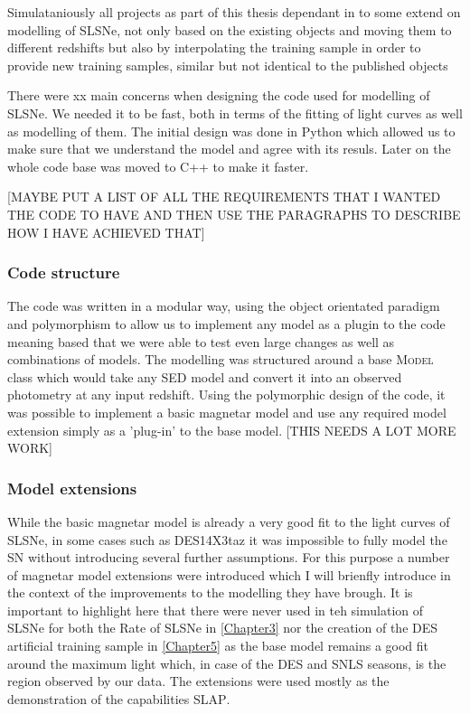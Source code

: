 Simulataniously all projects as part of this thesis dependant in to some extend on modelling of SLSNe, not only based on the existing objects and moving them to different redshifts but also by interpolating the training sample in order to provide new training samples, similar but not identical to the published objects

There were xx main concerns when designing the code used for modelling of SLSNe. We needed it to be fast, both in terms of the fitting of light curves as well as modelling of them. The initial design was done in Python which allowed us to make sure that we understand the model and agree with its resuls. Later on the whole code base was moved to C++ to make it faster.

[MAYBE PUT A LIST OF ALL THE REQUIREMENTS THAT I WANTED THE CODE TO HAVE AND THEN USE THE PARAGRAPHS TO DESCRIBE HOW I HAVE ACHIEVED THAT]

\subsubsection{Code structure}
The code was written in a modular way, using the object orientated paradigm and polymorphism to allow us to implement any model as a plugin to the code meaning based that we were able to test even large changes as well as combinations of models. The modelling was structured around a base \textsc{Model} class which would take any SED model and convert it into an observed photometry at any input redshift. Using the polymorphic design of the code, it was possible to implement a basic magnetar model and use any required model extension simply as a 'plug-in' to the base model. [THIS NEEDS A LOT MORE WORK]

\subsubsection{Model extensions}
While the basic magnetar model is already a very good fit to the light curves of SLSNe, in some cases such as DES14X3taz it was impossible to fully model the SN without introducing several further assumptions. For this purpose a number of magnetar model extensions were introduced which I will brienfly introduce in the context of the improvements to the modelling they have brough. It is important to highlight here that there were never used in teh simulation of SLSNe for both the Rate of SLSNe in \cref{Chapter3} nor the creation of the DES artificial training sample in \cref{Chapter5} as the base model remains a good fit around the maximum light which, in case of the DES and SNLS seasons, is the region observed by our data. The extensions were used mostly as the demonstration of the capabilities \textsc{SLAP}.

